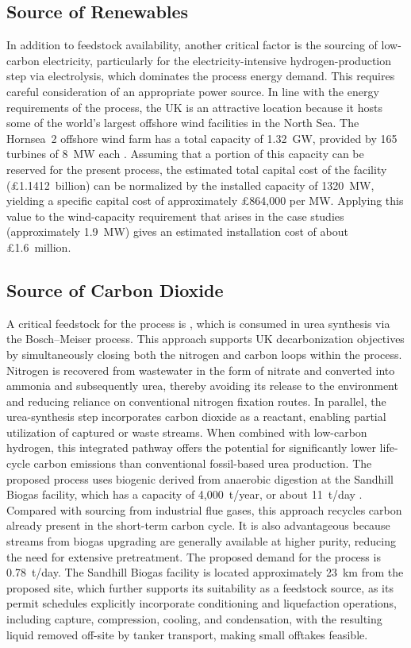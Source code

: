 \documentclass[letterpaper]{article}
\begin{document}
\subsection{Source of Renewables}
In addition to feedstock availability, another critical factor is the
sourcing of low-carbon electricity, particularly for the
electricity-intensive hydrogen-production step via electrolysis,
which dominates the process energy demand. This requires careful
consideration of an appropriate power source. In line with the energy
requirements of the process, the UK is an attractive location because
it hosts some of the world's largest offshore wind facilities in the
North Sea. The Hornsea~2 offshore wind farm has a total capacity of
1.32~GW, provided by 165 turbines of 8~MW each
\cite{OrstedHornsea22026}. Assuming that a portion of this capacity
can be reserved for the present process, the estimated total capital
cost of the facility (\pounds 1.1412~billion)
\cite{OfgemHornsea22023} can be normalized by the installed capacity
of 1320~MW, yielding a specific capital cost of approximately
\pounds 864{,}000 per MW. Applying this value to the wind-capacity
requirement that arises in the case studies (approximately 1.9~MW)
gives an estimated installation cost of about \pounds 1.6~million.

\subsection{Source of Carbon Dioxide}
A critical feedstock for the process is , which is consumed
in urea synthesis via the Bosch--Meiser process. This approach
supports UK decarbonization objectives by simultaneously closing both
the nitrogen and carbon loops within the process. Nitrogen is
recovered from wastewater in the form of nitrate and converted into
ammonia and subsequently urea, thereby avoiding its release to the
environment and reducing reliance on conventional nitrogen fixation
routes. In parallel, the urea-synthesis step incorporates carbon
dioxide as a reactant, enabling partial utilization of captured or
waste  streams. When combined with low-carbon hydrogen, this
integrated pathway offers the potential for significantly lower
life-cycle carbon emissions than conventional fossil-based urea
production. The proposed process uses biogenic  derived from
anaerobic digestion at the Sandhill Biogas facility, which has a
capacity of 4{,}000~t/year, or about 11~t/day
\cite{DESNZTeessideCCUS2025}. Compared with sourcing  from
industrial flue gases, this approach recycles carbon already present
in the short-term carbon cycle. It is also advantageous because
 streams from biogas upgrading are generally available at
higher purity, reducing the need for extensive pretreatment. The
proposed  demand for the process is 0.78~t/day. The Sandhill
Biogas facility is located approximately 23~km from the proposed
site, which further supports its suitability as a feedstock source,
as its permit schedules explicitly incorporate  conditioning
and liquefaction operations, including capture, compression, cooling,
and condensation, with the resulting liquid  removed off-site
by tanker transport, making small offtakes feasible.
\end{document}
